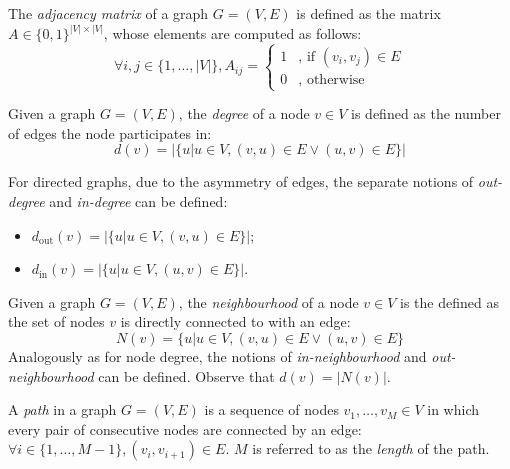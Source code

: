 \begin{definition}
The \emph{adjacency matrix} of a graph $G=(V, E)$ is defined as the matrix $A \in \{0,1\}^{|V| \times |V|}$, whose elements are computed as follows:
\begin{equation}
\forall i,j \in \{1, \dots, |V|\}, A_{ij} = \begin{cases}1 &\text{, if }(v_i, v_j) \in E \\ 0 & \text{, otherwise} \end{cases}
\end{equation}
\end{definition}

\begin{definition}
Given a graph $G=(V, E)$, the \emph{degree} of a node $v \in V$ is defined as the number of edges the node participates in: 
\begin{equation}
d(v) = |\{u|u \in V, (v, u) \in E \vee (u, v) \in E \}|
\end{equation}

For directed graphs, due to the asymmetry of edges, the separate notions of \emph{out-degree} and \emph{in-degree} can be defined:
\begin{itemize}
\item $d_{\text{out}}(v) = |\{u|u \in V, (v, u) \in E \}|$;
\item $d_{\text{in}}(v) = |\{u|u \in V, (u, v) \in E \}|$.
\end{itemize}
\end{definition}

\begin{definition}
Given a graph $G=(V, E)$, the \emph{neighbourhood} of a node $v \in V$ is the defined as the set of nodes $v$ is directly connected to with an edge: \begin{equation}
N(v)=\{u|u\in V, (v,u) \in E \vee (u,v) \in E \}
\end{equation} 
Analogously as for node degree, the notions of \emph{in-neighbourhood} and \emph{out-neighbourhood} can be defined. Observe that $d(v)=|N(v)|$.
\end{definition}

\begin{definition}
A \emph{path} in a graph $G=(V, E)$ is a sequence of nodes $v_1,\dots,v_M \in V$ in which every pair of consecutive nodes are connected by an edge:\\ $\forall i \in \{1,\dots,M-1\},(v_i,v_{i+1})\in E$. $M$ is referred to as the \emph{length} of the path.
\end{definition}

